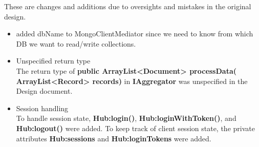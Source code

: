 \documentclass[oneside, english, final]{design}
\begin{document}
These are changes and additions due to oversights and mistakes in the original design.

\begin{itemize}
  \item{added dbName to MongoClientMediator since we need to know from which DB we want to read/write collections.}
        \\

  \item{Unspecified return type}
        \\
        The return type of \textsf{\textbf{public ArrayList<Document> processData( ArrayList<Record> records)}} in \textsf{\textbf{IAggregator}}
        was unspecified in the Design document.

  \item{Session handling}
        \\
        To handle session state, \textsf{\textbf{Hub:login()}}, \textsf{\textbf{Hub:loginWithToken()}}, and \textsf{\textbf{Hub:logout()}} were added.
        To keep track of client session state, the private attributes \textsf{\textbf{Hub:sessions}} and \textsf{\textbf{Hub:loginTokens}} were added.

\end{itemize}
\end{document}
